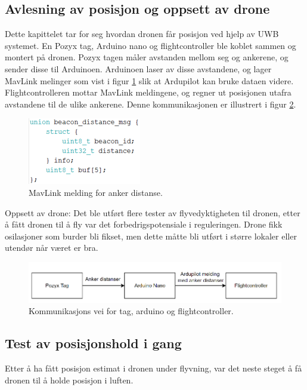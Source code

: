 \subsection{Avlesning av posisjon og oppsett av drone}
Dette kapittelet tar for seg hvordan dronen får posisjon ved hjelp av UWB systemet.
En Pozyx tag, Arduino nano og flightcontroller ble koblet sammen og montert på dronen. 
Pozyx tagen måler avstanden mellom seg og ankerene, og sender disse til Arduinoen. Arduinoen laser av disse avstandene, 
og lager MavLink melinger som vist i figur \ref{fig:melding} slik at Ardupilot kan bruke dataen videre. 
Flightcontrolleren mottar MavLink meldingene, og regner ut posisjonen utafra avstandene til de ulike ankerene. 
Denne kommunikasjonen er illustrert i figur \ref{fig:kommunikasjon}.

\begin{figure}[htp]
\centering
\includegraphics[width=0.5\columnwidth]{figures/melding}
\caption{MavLink melding for anker distanse.}
\label{fig:melding}
\end{figure}

Oppsett av drone:
Det ble utført flere tester av flyvedyktigheten til dronen, etter å fått dronen til å fly var det forbedrigspotensiale i reguleringen. 
Drone fikk osilasjoner som burder bli fikset, men dette måtte bli utført i større lokaler eller utendør når været er bra. 

\begin{figure}[htp]
\centering
\includegraphics[width=0.5\columnwidth]{figures/kommunikasjon}
\caption{Kommunikasjons vei for tag, arduino og flightcontroller.}
\label{fig:kommunikasjon}
\end{figure}

\subsection{Test av posisjonshold i gang}
Etter å ha fått posisjon estimat i dronen under flyvning, var det neste steget å få dronen til å holde posisjon i luften. 

